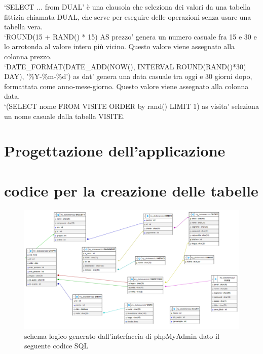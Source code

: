 \documentclass[a4paper,12pt]{report}
\begin{document}
`SELECT ... from DUAL' è
una clausola che seleziona dei valori da una tabella fittizia chiamata DUAL, che
serve per eseguire delle operazioni senza usare una tabella vera.\\
`ROUND(15 + RAND() * 15) AS prezzo' genera un numero casuale fra 15 e 30
e lo arrotonda al valore intero più vicino. Questo valore viene assegnato alla colonna prezzo.\\
`DATE\_FORMAT(DATE\_ADD(NOW(), INTERVAL ROUND(RAND()*30) DAY), '\%Y-\%m-\%d') as dat' genera
una data casuale tra oggi e 30 giorni dopo, formattata come anno-mese-giorno.
Questo valore viene assegnato alla colonna data.\\
`(SELECT nome FROM VISITE ORDER by rand() LIMIT 1) as visita' seleziona un
nome casuale dalla tabella VISITE.


\chapter{Progettazione dell'applicazione}

\appendix
\chapter{codice per la creazione delle tabelle \label{A:CreateTable}}

\begin{figure}[H]
	\centering
	\includegraphics[height=0.67\textwidth,angle=90]{../resources/img/phpMyadmin.png}
	\caption{schema logico generato dall'interfaccia di phpMyAdmin dato il seguente codice SQL}
\end{figure}
\end{document}

